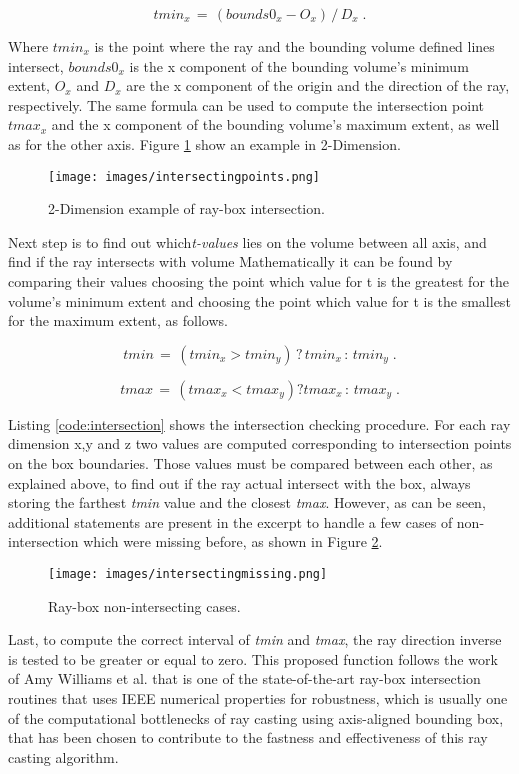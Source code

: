 \documentclass[12pt,a4paper]{extarticle}
\newcommand{\linespace}{\vspace{0pt}}
\begin{document}
\[
tmin_{x}\,=\,(bounds0_{x} - O_{x})\,/\,D_{x} \;.
\] 

Where $tmin_{x}$ is the point where the ray and the bounding volume defined lines intersect, $bounds0_{x}$ is the x component of the bounding volume's minimum extent, $O_{x}$ and $D_{x}$ are the x component of the origin and the direction of the ray, respectively. The same formula can be used to compute the intersection point $tmax_{x}$ and the x component of the bounding volume's maximum extent, as well as for the other axis. Figure \ref{fig:intersectingpoints} show an example in 2-Dimension.

\begin{figure}[hbtp]
\centering
\texttt{[image: images/intersectingpoints.png]}
\caption{2-Dimension example of ray-box intersection.}
\label{fig:intersectingpoints}
\end{figure}

Next step is to find out which\textit{t-values} lies on the volume between all axis, and find if the ray intersects with volume Mathematically it can be found by comparing their values choosing the point which value for t is the greatest for the volume's minimum extent and choosing the point which value for t is the smallest for the maximum extent, as follows.

\[
tmin\, =\, (tmin_{x} > tmin_{y})\, ?\, tmin_{x} \,:\, tmin_{y} \;.
\]

\[
tmax\, =\, (tmax_{x} < tmax_{y}) ? tmax_{x} \,:\, tmax_{y} \;.
\]


Listing \ref{code:intersection} shows the intersection checking procedure. For each ray dimension x,y and z two values are computed corresponding to intersection points on the box boundaries. Those values must be compared between each other, as explained above, to find out if the ray actual intersect with the box, always storing the farthest \textit{tmin} value and the closest \textit{tmax}.
However, as can be seen, additional statements are present in the excerpt to handle a few cases of non-intersection which were missing before, as shown in Figure \ref{fig:intersectionmissing}.
\linespace

\begin{figure}[hbtp]
\centering
\texttt{[image: images/intersectingmissing.png]}
\caption{Ray-box non-intersecting cases.}
\label{fig:intersectionmissing}
\end{figure}


Last, to compute the correct interval of \textit{tmin} and \textit{tmax}, the ray direction inverse is tested to be greater or equal to zero. This proposed function follows the work of Amy Williams et al. \cite{Williams:2005} that is one of the state-of-the-art ray-box intersection routines that uses IEEE numerical properties for robustness, which is usually one of the computational bottlenecks of ray casting using axis-aligned bounding box, that has been chosen to contribute to the fastness and effectiveness of this ray casting algorithm.
\end{document}
